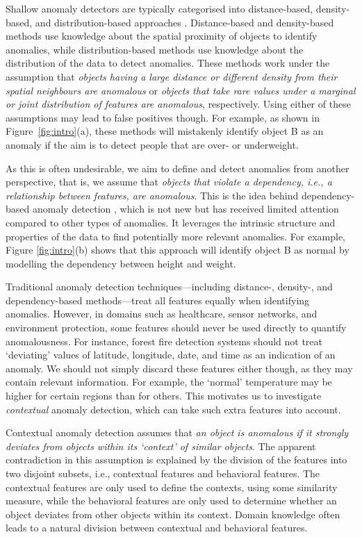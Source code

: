 \documentclass[pdflatex,sn-basic]{sn-jnl}%
\theoremstyle{thmstyleone}%
\theoremstyle{thmstyletwo}%
\theoremstyle{thmstylethree}%
\begin{document}
Shallow anomaly detectors are typically categorised into distance-based, density-based, and distribution-based approaches \citep{wang2019progress}. Distance-based and density-based methods use knowledge about the spatial proximity of objects to identify anomalies, while distribution-based methods use knowledge about the distribution of the data to detect anomalies. These methods work under the assumption that \textit{objects having a large distance or different density from their spatial neighbours are anomalous} or \textit{objects that take rare values under a marginal or joint distribution of features are anomalous}, respectively. Using either of these assumptions may lead to false positives though. For example, as shown in Figure~\ref{fig:intro}(a), these methods will mistakenly identify object B as an anomaly if the aim is to detect people that are over- or underweight.

As this is often undesirable, we aim to define and detect anomalies from another perspective, that is, we assume that \textit{objects that violate a dependency, i.e., a relationship between features, are anomalous}. This is the idea behind dependency-based anomaly detection \citep{lu2020dependency}, which is not new but has received limited attention compared to other types of anomalies. It leverages the intrinsic structure and properties of the data to find potentially more relevant anomalies. For example, Figure \ref{fig:intro}(b) shows that this approach will identify object B as normal by modelling the dependency between height and weight.

Traditional anomaly detection techniques---including distance-, density-, and dependency-based methods---treat all features equally when identifying anomalies. However, in domains such as healthcare, sensor networks, and environment protection, some features should never be used directly to quantify anomalousness. For instance, forest fire detection systems should not treat `deviating' values of latitude, longitude, date, and time as an indication of an anomaly. We should not simply discard these features either though, as they may contain relevant information. For example, the `normal' temperature may be higher for certain regions than for others. This motivates us to investigate \emph{contextual} anomaly detection, which can take such extra features into account.

Contextual anomaly detection assumes that \textit{an object is anomalous if it strongly deviates from objects within its `context' of similar objects}. The apparent contradiction in this assumption is explained by the division of the features into two disjoint subsets, i.e., contextual features and behavioral features. The contextual features are only used to define the contexts, using some similarity measure, while the behavioral features are only used to determine whether an object deviates from other objects within its context. Domain knowledge often leads to a natural division between contextual and behavioral features.
\end{document}
